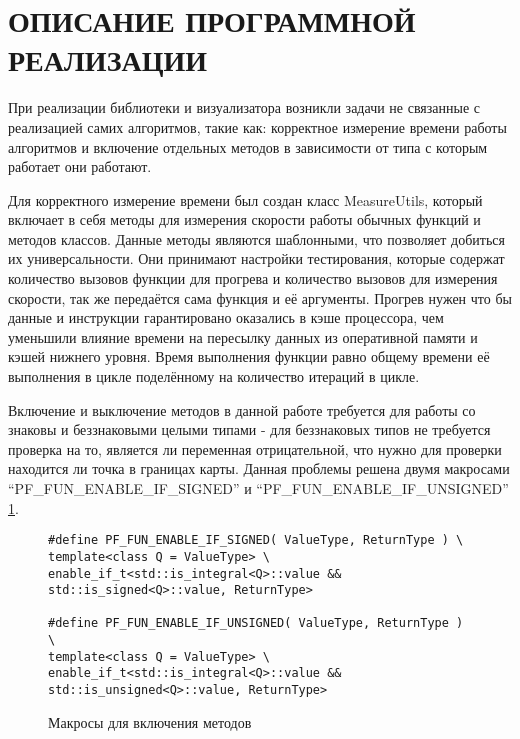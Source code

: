 \section[Описание программной реализации]{\MakeTextUppercase{ОПИСАНИЕ ПРОГРАММНОЙ РЕАЛИЗАЦИИ}}

\vspace{1\baselineskip} 

При реализации библиотеки и визуализатора возникли задачи не связанные с реализацией самих алгоритмов, такие как: корректное измерение времени работы алгоритмов и включение отдельных методов в зависимости от типа с которым работает они работают.

Для корректного измерение времени был создан класс MeasureUtils, который включает в себя методы для измерения скорости работы обычных функций и методов классов. Данные методы являются шаблонными, что позволяет добиться их универсальности. Они принимают настройки тестирования, которые содержат количество вызовов функции для прогрева и количество вызовов для измерения скорости, так же передаётся сама функция и её аргументы. Прогрев нужен что бы данные и инструкции гарантировано оказались в кэше процессора, чем уменьшили влияние времени на пересылку данных из оперативной памяти и кэшей нижнего уровня. Время выполнения функции равно общему времени её выполнения в цикле поделённому на количество итераций в цикле.

Включение и выключение методов в данной работе требуется для работы со знаковы и беззнаковыми целыми типами - для беззнаковых типов не требуется проверка на то, является ли переменная отрицательной, что нужно для проверки находится ли точка в границах карты. Данная проблемы решена двумя макросами  ``PF\_FUN\_ENABLE\_IF\_SIGNED'' и ``PF\_FUN\_ENABLE\_IF\_UNSIGNED'' \cref{fig:enable_fun_macro}.

\begin{figure}[!htb]
	\centering
	\captionsetup{justification=centering}
	\begin{lstlisting}
#define PF_FUN_ENABLE_IF_SIGNED( ValueType, ReturnType ) \
template<class Q = ValueType> \
enable_if_t<std::is_integral<Q>::value &&  std::is_signed<Q>::value, ReturnType>

#define PF_FUN_ENABLE_IF_UNSIGNED( ValueType, ReturnType ) \
template<class Q = ValueType> \
enable_if_t<std::is_integral<Q>::value &&  std::is_unsigned<Q>::value, ReturnType>
	\end{lstlisting}
	\caption{Макросы для включения методов}
	\label{fig:enable_fun_macro}
\end{figure}

